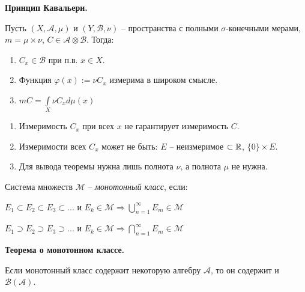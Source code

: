 \begin{theorem}
    \textbf{Принцип Кавальери.}

    Пусть $(X, \mathcal{A}, \mu)$ и $(Y, \mathcal{B}, \nu)$ – пространства с полными $\sigma$-конечными мерами, $m=\mu\times\nu$,
    $C\in \mathcal{A}\otimes \mathcal{B}$. Тогда:

    \begin{enumerate}
        \item $C_x\in \mathcal{B}$ при п.в. $x\in X$.
        
        \item Функция $\varphi (x) := \nu C_x$ измерима в широком смысле.
        
        \item $m C=\int\limits_X \nu C_x d\mu (x)$
    \end{enumerate}
\end{theorem}

\begin{remark}
    \begin{enumerate}
        \item Измеримость $C_x$ при всех $x$ не гарантирует измеримость $C$.
        
        \item Измеримости всех $C_x$ может не быть: $E$ – неизмеримое $\subset \mathbb{R}$, $\{0\}\times E$.

        \item Для вывода теоремы нужна лишь полнота $\nu$, а полнота $\mu$ не нужна.
    \end{enumerate}
\end{remark}

\begin{definition}
    Система множеств $\mathcal{M}$ – \textit{монотонный класс}, если:

    $E_1\subset E_2\subset E_3\subset ...$ и $E_k\in \mathcal{M} \Rightarrow \bigcup\limits_{n=1}^\infty E_m \in \mathcal{M}$

    $E_1\supset E_2\supset E_3\supset ...$ и $E_k\in \mathcal{M} \Rightarrow \bigcap\limits_{n=1}^\infty E_m \in \mathcal{M}$
\end{definition}

\begin{theorem}
    \textbf{Теорема о монотонном классе.}

    Если монотонный класс содержит некоторую алгебру $\mathcal{A}$, то он содержит и $\mathcal{B}(\mathcal{A})$.
\end{theorem}

